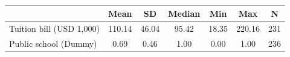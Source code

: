 {
\def\sym#1{\ifmmode^{#1}\else\(^{#1}\)\fi}
\begin{tabular}{l*{1}{cccccc}}
\hline\hline
                    &        Mean&          SD&      Median&         Min&         Max&           N\\
\hline
Tuition bill (USD 1,000)&      110.14&       46.04&       95.42&       18.35&      220.16&         231\\
Public school (Dummy)&        0.69&        0.46&        1.00&        0.00&        1.00&         236\\
\hline\hline
\end{tabular}
}

